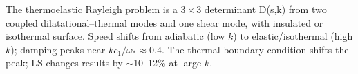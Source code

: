 \begin{summarybox}[Summary]
The thermoelastic Rayleigh problem is a $3\times3$ determinant \mathcal D(s,k) from two coupled dilatational--thermal modes and one shear mode, with insulated or isothermal surface. Speed shifts from adiabatic (low $k$) to elastic/isothermal (high $k$); damping peaks near $k c_1/\omega_*\approx0.4$. The thermal boundary condition shifts the peak; LS changes results by $\sim$10--12\% at large $k$.
\end{summarybox}
